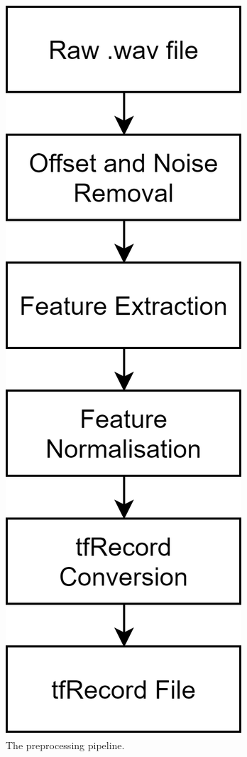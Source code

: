 \documentclass[a4paper,11pt,notitlepage]{article}
\begin{document}
\begin{figure}[H]
	\centering
	\vspace{0.5cm}
	\includegraphics[scale = 0.17]{diagrams/preprocessing.png}
	\caption{The preprocessing pipeline.}
	\label{preprocessing_pipeline}
\end{figure}
\end{document}
